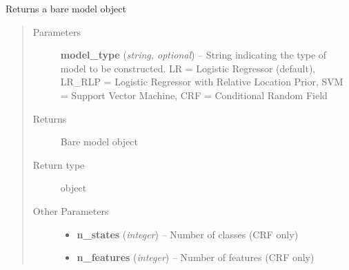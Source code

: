 \documentclass[letterpaper,10pt,english]{sphinxmanual}
\begin{document}

\begin{fulllineitems}
\label{classification:flamingo.classification.models.get_model}
Returns a bare model object
\begin{quote}\begin{description}
\item[{Parameters}] \leavevmode
\textbf{model\_type} (\emph{string, optional}) -- String indicating the type of model to be constructed.
LR = Logistic Regressor (default), LR\_RLP = Logistic Regressor with Relative Location Prior, SVM = Support Vector Machine, CRF = Conditional Random Field

\item[{Returns}] \leavevmode
Bare model object

\item[{Return type}] \leavevmode
object

\item[{Other Parameters}] \leavevmode\begin{itemize}
\item {} 
\textbf{n\_states} (\emph{integer}) --
Number of classes (CRF only)

\item {} 
\textbf{n\_features} (\emph{integer}) --
Number of features (CRF only)

\end{itemize}

\end{description}\end{quote}

\end{fulllineitems}

\end{document}
